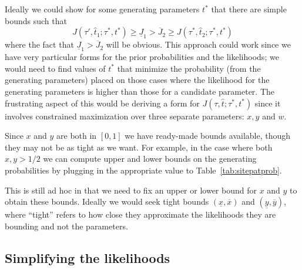 \documentclass[a4paper]{article}
\begin{document}
Ideally we could show for some generating parameters $t^*$ that there are simple bounds such that
$$
J(\tau', \hat{t}_1; \tau^*, t^*) \geq \underline{J}_1 > \overline{J}_2 \geq J(\tau^*, \hat{t}_2; \tau^*, t^*)
$$
where the fact that $\underline{J}_1 > \overline{J}_2$ will be obvious.
This approach could work since we have very particular forms for the prior probabilities and the likelihoods; we would need to find values of $t^*$ that minimize the probability (from the generating parameters) placed on those cases where the likelihood for the generating parameters is higher than those for a candidate parameter.
The frustrating aspect of this would be deriving a form for $J(\tau, \hat{t}; \tau^*, t^*)$ since it involves constrained maximization over three separate parameters: $x, y$ and $w$.

Since $x$ and $y$ are both in $[0,1]$ we have ready-made bounds available, though they may not be as tight as we want.
For example, in the case where both $x,y > 1/2$ we can compute upper and lower bounds on the generating probabilities by plugging in the appropriate value to Table~\ref{tab:sitepatprob}.

This is still ad hoc in that we need to fix an upper or lower bound for $x$ and $y$ to obtain these bounds.
Ideally we would seek tight bounds $(\underline{x}, \overline{x})$ and $(\underline{y}, \overline{y})$, where ``tight'' refers to how close they approximate the likelihoods they are bounding and not the parameters.

\subsection{Simplifying the likelihoods}
\end{document}
